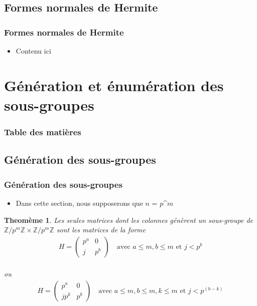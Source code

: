 \documentclass{beamer}
\newtheorem{thm}{Theomème}
\begin{document}
\subsection{Formes normales de Hermite}
\begin{frame}
\frametitle{Formes normales de Hermite}
\begin{itemize}
\item Contenu ici
\end{itemize}
\end{frame}

\section{Génération et énumération des sous-groupes}
\begin{frame}
\frametitle{Table des matières}
\tableofcontents[currentsection]
\end{frame}

\subsection{Génération des sous-groupes}
\begin{frame}
\frametitle{Génération des sous-groupes}
\begin{itemize}
    \item Dans cette section, nous supposerons que $n$ = ${p}$^${m}$
\end{itemize}
\begin{thm}
    Les seules matrices dont les colonnes génèrent un sous-groupe de $\mathbb{Z}/p^m\mathbb{Z} \times \mathbb{Z}/p^m\mathbb{Z}$ sont les matrices de la forme
    \begin{align*}
        H = \begin{pmatrix}
        p^a & 0 \\
        j & p^b 
        \end{pmatrix}
        \quad \text{avec } a \leq m, b \leq m \text{ et } j < p^b    
    \end{align*}\\
    \center ou
    \begin{align*}
        H = \begin{pmatrix}
        p^a & 0 \\
        jp^k & p^b 
        \end{pmatrix}
        \quad \text{avec } a \leq m, b \leq m, k \leq m \text{ et } j < p^(b-k)
    \end{align*}
    
\end{thm}
\end{frame}
\end{document}
